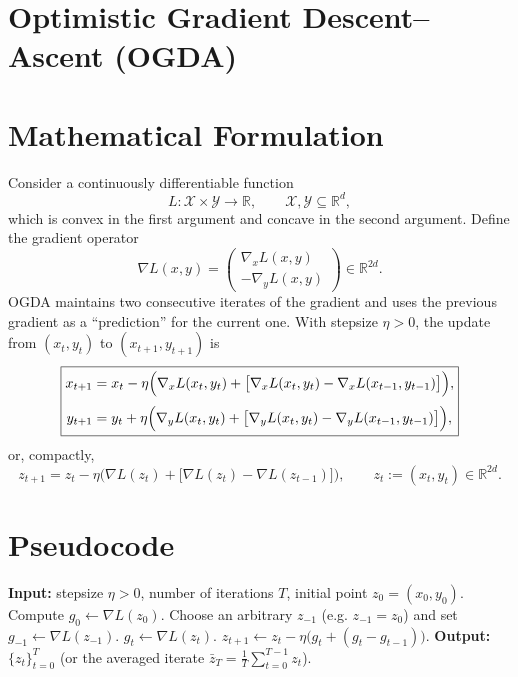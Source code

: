 \documentclass{article}
\newcommand{\R}{\mathbb{R}}
\begin{document}
\section*{Optimistic Gradient Descent–Ascent (OGDA)}

\section*{Mathematical Formulation}
Consider a continuously differentiable function 
\[
L:\mathcal{X}\times\mathcal{Y}\to\R,\qquad \mathcal{X},\mathcal{Y}\subseteq\R^{d},
\]
which is convex in the first argument and concave in the second argument.
Define the gradient operator
\[
\nabla L(x,y)=\begin{pmatrix}
\nabla_{x}L(x,y)\\[2mm]
-\nabla_{y}L(x,y)
\end{pmatrix}\in\R^{2d}.
\]
OGDA maintains two consecutive iterates of the gradient and uses the
previous gradient as a ``prediction'' for the current one.  
With stepsize $\eta>0$, the update from $(x_{t},y_{t})$ to $(x_{t+1},y_{t+1})$ is
\[
\boxed{
\begin{aligned}
x_{t+1}&=x_{t}-\eta\Bigl(\nabla_{x}L(x_{t},y_{t})+ \bigl[\nabla_{x}L(x_{t},y_{t})-\nabla_{x}L(x_{t-1},y_{t-1})\bigr]\Bigr),\\[1mm]
y_{t+1}&=y_{t}+\eta\Bigl(\nabla_{y}L(x_{t},y_{t})+ \bigl[\nabla_{y}L(x_{t},y_{t})-\nabla_{y}L(x_{t-1},y_{t-1})\bigr]\Bigr),
\end{aligned}}
\]
or, compactly,
\[
z_{t+1}=z_{t}-\eta\bigl(\nabla L(z_{t})+\bigl[\nabla L(z_{t})-\nabla L(z_{t-1})\bigr]\bigr),
\qquad 
z_{t}:=(x_{t},y_{t})\in\R^{2d}.
\]

\section*{Pseudocode}
\begin{algorithm}[H]
\caption{Optimistic Gradient Descent–Ascent (OGDA)}
\begin{algorithmic}[1]
\State \textbf{Input:} stepsize $\eta>0$, number of iterations $T$, initial point $z_{0}=(x_{0},y_{0})$.
\State Compute $g_{0}\gets \nabla L(z_{0})$.
\State Choose an arbitrary $z_{-1}$ (e.g. $z_{-1}=z_{0}$) and set $g_{-1}\gets \nabla L(z_{-1})$.
    \State $g_{t}\gets \nabla L(z_{t})$.
    \State $z_{t+1}\gets z_{t}-\eta\bigl(g_{t}+ (g_{t}-g_{t-1})\bigr)$.
\EndFor
\State \textbf{Output:} $\{z_{t}\}_{t=0}^{T}$ (or the averaged iterate $\bar z_{T}=\tfrac1T\sum_{t=0}^{T-1}z_{t}$).
\end{algorithmic}
\end{algorithm}
\end{document}
